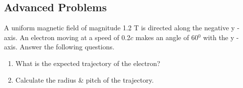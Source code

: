 \documentclass[9pt,addpoints]{exam}
\begin{document}
\begin{questions}
		\subsection*{Advanced Problems}
		\question A uniform magnetic field of magnitude 1.2 T is directed along the negative y - axis. An electron moving at a speed of 0.2$c$ makes an angle of 60$^0$ with the y - axis. Answer the following questions.
		\begin{enumerate}[label=(\Roman*)]
			\item What is the expected trajectory of the electron?
			\item Calculate the radius \& pitch of the trajectory.
		\end{enumerate}
	\end{questions}		
\end{document}
